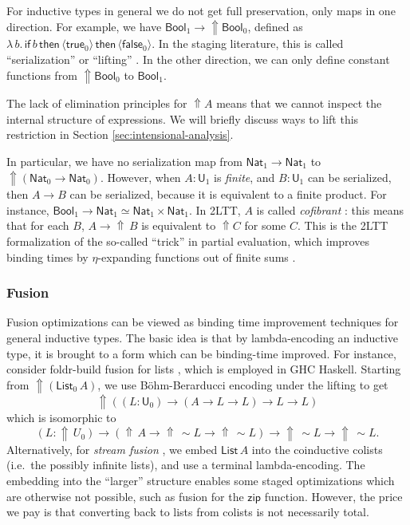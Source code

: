 \documentclass[acmsmall,anonymous,review]{acmart}
\newcommand{\msf}[1]{\mathsf{#1}}
\newcommand{\Lift}{{\Uparrow}}
\newcommand{\spl}{{\sim}}
\newcommand{\qut}[1]{\langle #1\rangle}
\renewcommand{\U}{\msf{U}}
\newcommand{\Bool}{\msf{Bool}}
\newcommand{\true}{\msf{true}}
\newcommand{\false}{\msf{false}}
\newcommand{\List}{\msf{List}}
\newcommand{\Nat}{\msf{Nat}}
\theoremstyle{remark}
\begin{document}
For inductive types in general we do not get full preservation, only maps in one
direction. For example, we have $\Bool_1 \to \Lift \Bool_0$, defined as
$\lambda\,b.\,\msf{if}\,b\,\msf{then}\,\qut{\true_0}\,\msf{then}\,\qut{\false_0}$.
In the staging literature, this is called ``serialization'' or ``lifting''
\cite{template-haskell,metaml}.  In the other direction, we can only define
constant functions from $\Lift \Bool_0$ to $\Bool_1$.

The lack of elimination principles for $\Lift A$ means that we cannot inspect
the internal structure of expressions. We will briefly discuss ways to lift this
restriction in Section \ref{sec:intensional-analysis}.

In particular, we have no serialization map from $\Nat_1 \to \Nat_1$ to
$\Lift(\Nat_0 \to \Nat_0)$. However, when $A : \U_1$ is \emph{finite}, and $B :
\U_1$ can be serialized, then $A \to B$ can be serialized, because it is
equivalent to a finite product. For instance, $\Bool_1 \to \Nat_1 \simeq \Nat_1
\times \Nat_1$.  In 2LTT, $A$ is called \emph{cofibrant}
\cite[Section~3.4]{twolevel}: this means that for each $B$, $A \to \Lift\,B$ is
equivalent to $\Lift C$ for some $C$. This is the 2LTT formalization of the
so-called ``trick'' in partial evaluation, which improves binding times by
$\eta$-expanding functions out of finite sums \cite{eta-expansion-trick}.

\subsubsection{Fusion}
Fusion optimizations can be viewed as binding time improvement techniques for
general inductive types. The basic idea is that by lambda-encoding an inductive
type, it is brought to a form which can be binding-time improved. For instance,
consider foldr-build fusion for lists \cite{short-cut}, which is employed in GHC
Haskell.  Starting from $\Lift (\List_0\,A)$, we use Böhm-Berarducci encoding
\cite{boehm-berarducci} under the lifting to get
\[ \Lift((L : \U_0) \to (A \to L \to L) \to L \to L) \]
which is isomorphic to
\[ (L : \Lift\,U_0) \to (\Lift\,A \to \Lift\,\spl L \to \Lift\,\spl L)
    \to \Lift\,\spl L \to \Lift\,\spl L. \]
Alternatively, for \emph{stream fusion} \cite{stream-fusion}, we embed $\List\,A$ into the
coinductive colists (i.e.\ the possibly infinite lists), and use a terminal
lambda-encoding. The embedding into the ``larger'' structure enables some staged
optimizations which are otherwise not possible, such as fusion for the
$\msf{zip}$ function. However, the price we pay is that converting
back to lists from colists is not necessarily total.
\end{document}
